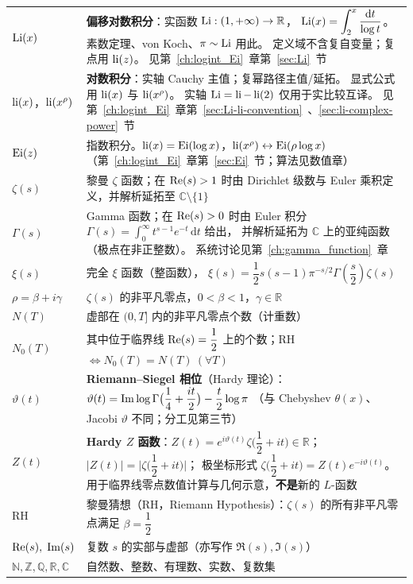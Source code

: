 \begin{longtable}{@{}lp{10cm}@{}}
$\operatorname{Li}(x)$
  & \textbf{偏移对数积分}：实函数
    $\operatorname{Li}:(1,+\infty)\to\mathbb{R}$，
    $\operatorname{Li}(x)=\displaystyle\int_2^x\dfrac{\mathrm{d}t}{\log t}$。
    素数定理、von Koch、$\pi\sim\operatorname{Li}$ 用此。
    定义域不含复自变量；复点用 $\operatorname{li}(z)$。
    见第~\ref{ch:logint_Ei}~章第~\ref{sec:Li}~节 \\
$\operatorname{li}(x)$，$\operatorname{li}(x^{\rho})$
  & \textbf{对数积分}：实轴 Cauchy 主值；复幂路径主值/延拓。
    显式公式用 $\operatorname{li}(x)$ 与 $\operatorname{li}(x^{\rho})$。
    实轴 $\operatorname{Li}=\operatorname{li}-\operatorname{li}(2)$ 仅用于实比较互译。
    见第~\ref{ch:logint_Ei}~章第~\ref{sec:Li-li-convention}~、\ref{sec:li-complex-power}~节 \\
$\operatorname{Ei}(z)$
  & 指数积分。$\operatorname{li}(x)=\operatorname{Ei}(\log x)$，$\operatorname{li}(x^{\rho})\leftrightarrow\operatorname{Ei}(\rho\log x)$
    （第~\ref{ch:logint_Ei}~章第~\ref{sec:Ei}~节；算法见数值章） \\
$\zeta(s)$
  & 黎曼 $\zeta$ 函数；在 $\operatorname{Re}(s)>1$ 时由 Dirichlet 级数与 Euler 乘积定义，并解析延拓至 $\mathbb{C}\setminus\{1\}$ \\
$\Gamma(s)$
  & Gamma 函数；在 $\operatorname{Re}(s)>0$ 时由 Euler 积分
    $\Gamma(s)=\displaystyle\int_0^\infty t^{s-1}e^{-t}\,\mathrm{d}t$ 给出，
    并解析延拓为 $\mathbb{C}$ 上的亚纯函数（极点在非正整数）。
    系统讨论见第~\ref{ch:gamma_function}~章 \\
$\xi(s)$
  & 完全 $\xi$ 函数（整函数），
    $\xi(s)=\dfrac{1}{2}s(s-1)\pi^{-s/2}\Gamma\!\left(\dfrac{s}{2}\right)\zeta(s)$ \\
$\rho=\beta+i\gamma$
  & $\zeta(s)$ 的非平凡零点，$0<\beta<1$，$\gamma\in\mathbb{R}$ \\
$N(T)$
  & 虚部在 $(0,T]$ 内的非平凡零点个数（计重数） \\
$N_0(T)$
  & 其中位于临界线 $\operatorname{Re}(s)=\dfrac{1}{2}$ 上的个数；RH $\iff N_0(T)=N(T)\ (\forall T)$ \\
$\vartheta(t)$
  & \textbf{Riemann--Siegel 相位}（Hardy 理论）：
    $\vartheta(t)=\operatorname{Im}\log\Gamma\bigl(\dfrac{1}{4}+\dfrac{it}{2}\bigr)-\dfrac{t}{2}\log\pi$
    （与 Chebyshev $\theta(x)$、Jacobi $\vartheta$ 不同；分工见第三节） \\
$Z(t)$
  & \textbf{Hardy $Z$ 函数}：$Z(t)=e^{i\vartheta(t)}\zeta\bigl(\dfrac{1}{2}+it\bigr)\in\mathbb{R}$；
    $\bigl|Z(t)\bigr|=\bigl|\zeta\bigl(\dfrac{1}{2}+it\bigr)\bigr|$；
    极坐标形式 $\zeta\bigl(\dfrac{1}{2}+it\bigr)=Z(t)e^{-i\vartheta(t)}$。
    用于临界线零点数值计算与几何示意，\textbf{不是}新的 $L$-函数 \\
$\mathrm{RH}$
  & 黎曼猜想（RH，Riemann Hypothesis）：$\zeta(s)$ 的所有非平凡零点满足 $\beta=\dfrac{1}{2}$ \\
$\operatorname{Re}(s),\;\operatorname{Im}(s)$
  & 复数 $s$ 的实部与虚部（亦写作 $\Re(s),\Im(s)$） \\
$\mathbb{N},\mathbb{Z},\mathbb{Q},\mathbb{R},\mathbb{C}$
  & 自然数、整数、有理数、实数、复数集 \\
\bottomrule
\end{longtable}

